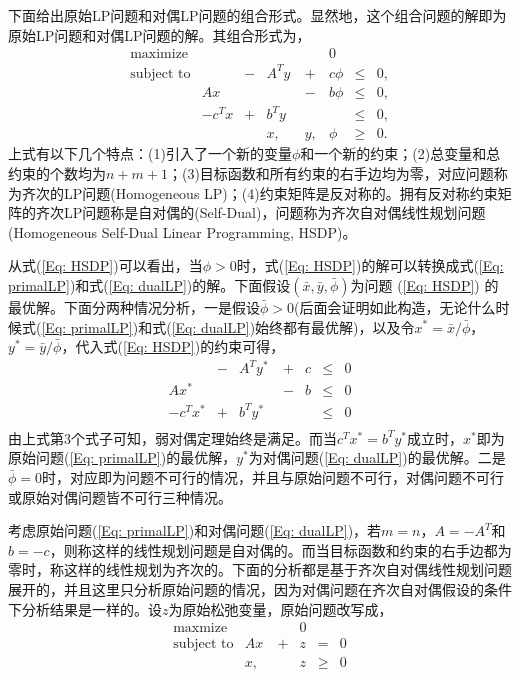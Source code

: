 \documentclass{ctexart}
\numberwithin{equation}{section} %
\begin{document}
下面给出原始LP问题和对偶LP问题的组合形式。显然地，这个组合问题的解即为原始LP问题和对偶LP问题的解。其组合形式为，
\begin{equation}
	\label{Eq: HSDP}
	\begin{array}{crcrcccc}
		\textrm{maximize} & & & & & 0 & &  \\
		\textrm{subject to} & & - & A^{T}y \  & + & c\phi & \leq & 0, \\
		& Ax  & & & - & b\phi & \leq & 0, \\
		& -c^{T}x & + & b^{T}y \  & & & \leq & 0, \\
		& & & x, & y, & \phi & \geq & 0.
	\end{array}
\end{equation}
上式有以下几个特点：(1)引入了一个新的变量$ \phi $和一个新的约束；(2)总变量和总约束的个数均为$ n + m + 1 $；(3)目标函数和所有约束的右手边均为零，对应问题称为齐次的LP问题(Homogeneous LP)；(4)约束矩阵是反对称的。拥有反对称约束矩阵的齐次LP问题称是自对偶的(Self-Dual)，问题称为齐次自对偶线性规划问题(Homogeneous Self-Dual Linear Programming, HSDP)。

从式(\ref{Eq: HSDP})可以看出，当$ \phi > 0 $时，式(\ref{Eq: HSDP})的解可以转换成式(\ref{Eq: primalLP})和式(\ref{Eq: dualLP})的解。下面假设$ \left(\bar{x}, \bar{y}, \bar{\phi} \right) $为问题 (\ref{Eq: HSDP}) 的最优解。下面分两种情况分析，一是假设$ \bar{\phi} > 0 $(后面会证明如此构造，无论什么时候式(\ref{Eq: primalLP})和式(\ref{Eq: dualLP})始终都有最优解)，以及令$ x^{*} = \bar{x}/\bar{\phi} $，$ y^{*} = \bar{y}/\bar{\phi} $，代入式(\ref{Eq: HSDP})的约束可得，
\begin{equation}
	\begin{array}{rcrcccc}
		 & - & A^{T}y^* \  & + & c & \leq & 0 \\
		Ax^*  & & & - & b & \leq & 0 \\
		-c^{T}x^* & + & b^{T}y^* \  & & & \leq & 0 \\
	\end{array} \nonumber
\end{equation}
由上式第3个式子可知，弱对偶定理始终是满足。而当$ c^{T}x^* = b^{T}y^*  $成立时，$ x^* $即为原始问题(\ref{Eq: primalLP})的最优解，$ y^* $为对偶问题(\ref{Eq: dualLP})的最优解。二是$ \bar{\phi} = 0 $时，对应即为问题不可行的情况，并且与原始问题不可行，对偶问题不可行或原始对偶问题皆不可行三种情况。

考虑原始问题(\ref{Eq: primalLP})和对偶问题(\ref{Eq: dualLP})，若$ m = n $，$ A = -A^{T} $和$ b = -c $，则称这样的线性规划问题是自对偶的。而当目标函数和约束的右手边都为零时，称这样的线性规划为齐次的。下面的分析都是基于齐次自对偶线性规划问题展开的，并且这里只分析原始问题的情况，因为对偶问题在齐次自对偶假设的条件下分析结果是一样的。设$ z $为原始松弛变量，原始问题改写成，
\begin{equation}
	\label{Eq: primalHSDP}
	\begin{array}{crcccc}
		\textrm{maxmize} & & & 0 & &\\
		\textrm{subject to} & Ax\  & + & z & = & 0 \\
		 & x, & & z & \geq & 0 
	\end{array}
\end{equation}
\end{document}
